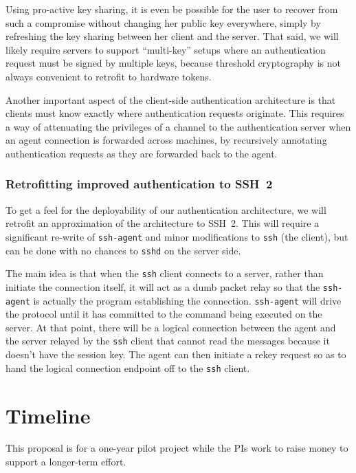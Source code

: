 \documentclass[11pt]{article}
\begin{document}
Using pro-active key sharing, it is even be possible for the user to
recover from such a compromise without changing her public key
everywhere, simply by refreshing the key sharing between her client
and the server.  That said, we will likely require servers to support
``multi-key'' setups where an authentication request must be signed by
multiple keys, because threshold cryptography is not always convenient
to retrofit to hardware tokens.

Another important aspect of the client-side authentication
architecture is that clients must know exactly where authentication
requests originate.  This requires a way of attenuating the privileges
of a channel to the authentication server when an agent connection is
forwarded across machines, by recursively annotating authentication
requests as they are forwarded back to the agent.

\subsubsection{Retrofitting improved authentication to SSH~2}

To get a feel for the deployability of our authentication
architecture, we will retrofit an approximation of the architecture to
SSH~2.  This will require a significant re-write of \texttt{ssh-agent}
and minor modifications to \texttt{ssh} (the client), but can be done
with no chances to \texttt{sshd} on the server side.

The main idea is that when the \texttt{ssh} client connects to a
server, rather than initiate the connection itself, it will act as a
dumb packet relay so that the \texttt{ssh-agent} is actually the
program establishing the connection.  \texttt{ssh-agent} will drive
the protocol until it has committed to the command being executed on
the server.  At that point, there will be a logical connection between
the agent and the server relayed by the \texttt{ssh} client that
cannot read the messages because it doesn't have the session key.  The
agent can then initiate a rekey request so as to hand the logical
connection endpoint off to the \texttt{ssh} client.

\section{Timeline}

This proposal is for a one-year pilot project while the PIs work to
raise money to support a longer-term effort.
\end{document}
